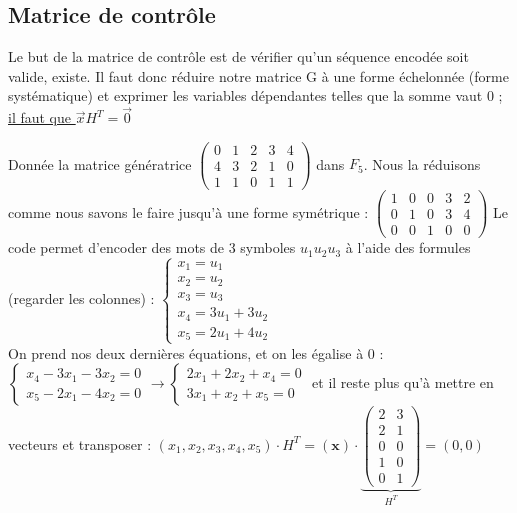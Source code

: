 \documentclass[11pt,a4paper]{article}
\renewcommand{\)}{\right)}
\renewcommand{\(}{\left(}
\begin{document}
\subsection{Matrice de contrôle}
\label{controle}
Le but de la matrice de contrôle est de vérifier qu'un séquence encodée soit valide, existe. Il faut donc réduire notre matrice G à une forme échelonnée (forme systématique) et exprimer les variables dépendantes telles que la somme vaut 0 ; \uline{il faut que $\vec{x}H^T = \vec{0}$}
\begin{exemple}
	Donnée la matrice génératrice 
	$\begin{pmatrix}
		0&1&2&3&4\\
		4&3&2&1&0\\
		1&1&0&1&1
	\end{pmatrix}$ dans $F_5$. Nous la réduisons comme nous savons le faire jusqu'à une forme symétrique : $\begin{pmatrix}
	1&0&0&3&2\\
	0&1&0&3&4\\
	0&0&1&0&0
	\end{pmatrix}$ Le code permet d'encoder des mots de 3 symboles $u_1u_2u_3$ à l'aide des formules (regarder les colonnes) :
	$\left\{\begin{array}{l}
	x_1 = u_1\\
	x_2 = u_2\\
	x_3 = u_3\\
	x_4 = 3u_1 + 3u_2\\
	x_5 = 2u_1 + 4u_2
	\end{array}\right.$\\
	 On prend nos deux dernières équations, et on les égalise à 0 :
	$\left\{\begin{array}{l}
	x_4-3x_1-3x_2 = 0\\
	x_5-2x_1-4x_2 = 0
	\end{array}\right. \to
	\left\{\begin{array}{l}
	2x_1+2x_2+x_4 = 0\\
	3x_1+x_2+x_5 = 0
	\end{array}\right.$ et il reste plus qu'à mettre en vecteurs et transposer :
	$(x_1,x_2,x_3,x_4,x_5)\cdot H^T = (\textbf{x}) \cdot \underbrace{\begin{pmatrix}
	2&3\\
	2&1\\
	0&0\\
	1&0\\
	0&1
	\end{pmatrix}}_{H^T} = (0,0)$
\end{exemple}
\end{document}
